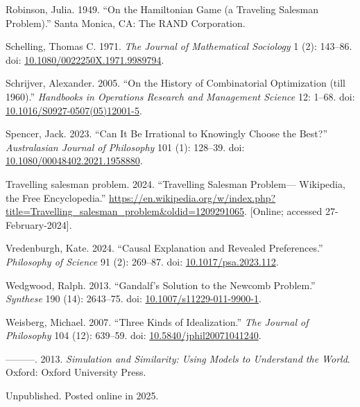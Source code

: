 \documentclass[
  11pt,
  letterpaper,
  DIV=11,
  numbers=noendperiod,
  twoside]{scrartcl}
\newlength{\cslhangindent}
\newenvironment{CSLReferences}[2] %
 {\begin{list}{}{%
  \setlength{\itemindent}{0pt}
  \setlength{\leftmargin}{0pt}
  \setlength{\parsep}{0pt}
  \ifodd #1
   \setlength{\leftmargin}{\cslhangindent}
   \setlength{\itemindent}{-1\cslhangindent}
  \fi
  \setlength{\itemsep}{#2\baselineskip}}}
 {\end{list}}
\begin{document}
\begin{CSLReferences}{1}{0}
Robinson, Julia. 1949. {``On the Hamiltonian Game (a Traveling Salesman
Problem).''} Santa Monica, CA: The RAND Corporation.

Schelling, Thomas C. 1971. \emph{The Journal of Mathematical Sociology}
1 (2): 143--86. doi:
\href{https://doi.org/10.1080/0022250X.1971.9989794}{10.1080/0022250X.1971.9989794}.

Schrijver, Alexander. 2005. {``On the History of Combinatorial
Optimization (till 1960).''} \emph{Handbooks in Operations Research and
Management Science} 12: 1--68. doi:
\href{https://doi.org/10.1016/S0927-0507(05)12001-5}{10.1016/S0927-0507(05)12001-5}.

Spencer, Jack. 2023. {``Can It Be Irrational to Knowingly Choose the
Best?''} \emph{Australasian Journal of Philosophy} 101 (1): 128--39.
doi:
\href{https://doi.org/10.1080/00048402.2021.1958880}{10.1080/00048402.2021.1958880}.

Travelling salesman problem. 2024. {``Travelling Salesman Problem---
{W}ikipedia{,} the Free Encyclopedia.''}
\url{https://en.wikipedia.org/w/index.php?title=Travelling_salesman_problem&oldid=1209291065}.
{[}Online; accessed 27-February-2024{]}.

Vredenburgh, Kate. 2024. {``Causal Explanation and Revealed
Preferences.''} \emph{Philosophy of Science} 91 (2): 269--87. doi:
\href{https://doi.org/10.1017/psa.2023.112}{10.1017/psa.2023.112}.

Wedgwood, Ralph. 2013. {``Gandalf's Solution to the Newcomb Problem.''}
\emph{Synthese} 190 (14): 2643--75. doi:
\href{https://doi.org/10.1007/s11229-011-9900-1}{10.1007/s11229-011-9900-1}.

Weisberg, Michael. 2007. {``Three Kinds of Idealization.''} \emph{The
Journal of Philosophy} 104 (12): 639--59. doi:
\href{https://doi.org/10.5840/jphil20071041240}{10.5840/jphil20071041240}.

---------. 2013. \emph{Simulation and Similarity: Using Models to
Understand the World}. Oxford: Oxford University Press.

\end{CSLReferences}



\noindent Unpublished. Posted online in 2025.
\end{document}
